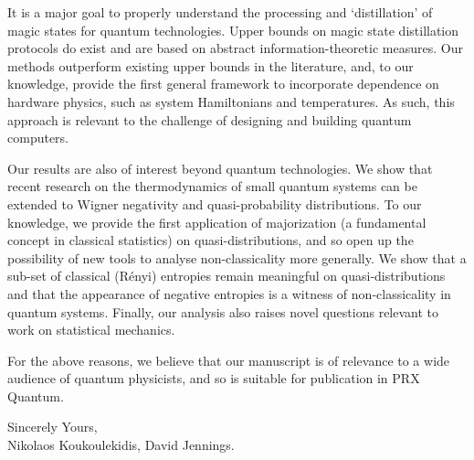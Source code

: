 \documentclass[11pt]{letter}
\begin{document}
It is a major goal to properly understand the processing and `distillation' of magic states for quantum technologies. Upper bounds on magic state distillation protocols do exist and are based on abstract information-theoretic measures. Our methods outperform existing upper bounds in the literature, and, to our knowledge, provide the first general framework to incorporate dependence on hardware physics, such as system Hamiltonians and temperatures. As such, this approach is relevant to the challenge of designing and building quantum computers.

Our results are also of interest beyond quantum technologies. We show that recent research on the thermodynamics of small quantum systems can be extended to Wigner negativity and quasi-probability distributions. To our knowledge, we provide the first application of majorization (a fundamental concept in classical statistics) on quasi-distributions, and so open up the possibility of new tools to analyse non-classicality more generally. We show that a sub-set of classical (R\'{e}nyi) entropies remain meaningful on quasi-distributions and that the appearance of negative entropies is a witness of non-classicality in quantum systems. Finally, our analysis also raises novel questions relevant to work on statistical mechanics.

For the above reasons, we believe that our manuscript is of relevance to a wide audience of quantum physicists, and so is suitable for publication in PRX Quantum.

\vspace{1cm}
\hspace{8cm}
\begin{minipage}{9cm}
\flushleft
Sincerely Yours,\\

Nikolaos Koukoulekidis, David Jennings.
\end{minipage}
\end{document}
